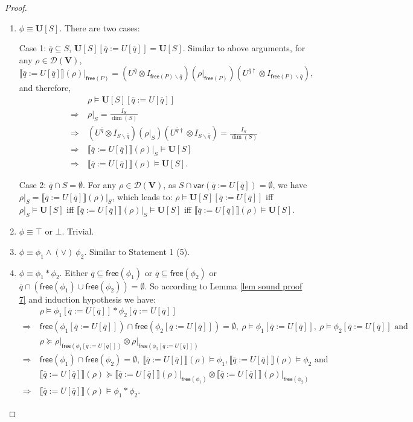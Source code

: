 \documentclass[conference,compsoc, 10pt]{IEEEtran}
\newcommand {\qbar} {{\overline{q}}}
\newcommand {\qU} {{\overline{q}:=U[\overline{q}]}}
\newcommand {\cD } {{\mathcal{D}}}
\newcommand {\id } {{I}}
\newcommand {\free }[1] {{\mathsf{free}\left(#1\right)}}
\newcommand {\rt }[2] {{\left.{#1}\right|_{#2}}}
\newcommand {\vars } {\mathbf{V}}
\newcommand {\var } {\mathsf{var}}
\newcommand {\unia } {{\mathbf{U}}}
\newcommand {\sem}[1] {\llbracket#1\rrbracket}
\begin{document}
\begin{appendices}
\begin{proof}
\begin{enumerate}
				
				\item $\phi\equiv \unia[S]$. There are two cases:
				
				Case 1: $\qbar\subseteq S$, $\unia[S][\qU] = \unia[S]$. Similar to above arguments, for any $\rho\in\cD(\vars)$,			
				$$\rt{\sem{\qU}(\rho)}{\free{P}} = (U^{\qbar}\otimes\id_{\free{P}\backslash \qbar})(\rt{\rho}{\free{P}}) (U^{\qbar\dag}\otimes\id_{\free{P}\backslash \qbar}),$$
				and therefore,
				\begin{align*}
				&\rho\models \unia[S][\qU] \\
				\Longrightarrow\ &\rt{\rho}{S} = \frac{I_S}{\dim(S)} \\
				\Longrightarrow\ &(U^{\qbar}\otimes\id_{S\backslash \qbar})(\rt{\rho}{S}) (U^{\qbar\dag}\otimes\id_{S\backslash \qbar}) = \frac{I_S}{\dim(S)}\\
				\Longrightarrow\ &\rt{\sem{\qU}(\rho)}{S}\models \unia[S] \\ 
				\Longrightarrow\ &\sem{\qU}(\rho)\models \unia[S].
				\end{align*}
				
				Case 2: $\qbar\cap S = \emptyset$. For any $\rho\in\cD(\vars)$, as $S\cap\var(\qU) = \emptyset$, we have
				$\rt{\rho}{S} = \rt{\sem{\qU}(\rho)}{S}$, which leads to: $\rho\models\unia[S][\qU]$ iff $\rt{\rho}{S}\models \unia[S]$ iff $\rt{\sem{\qU}(\rho)}{S}\models \unia[S]$ iff $\sem{\qU}(\rho)\models \unia[S]$.
				
				\item $\phi \equiv \top$ or $\bot$. Trivial.
				
				\item $\phi \equiv \phi_1\wedge\!(\vee)\ \phi_2$. Similar to Statement 1 (5).
				
				\item $\phi \equiv \phi_1\ast\phi_2$. Either $\qbar\subseteq\free{\phi_1}$ or $\qbar\subseteq\free{\phi_2}$ or $\qbar\cap(\free{\phi_1}\cup\free{\phi_2}) = \emptyset$. So according to Lemma \ref{lem sound proof 7} and induction hypothesis we have:
				\begin{align*}
				&\rho\models\phi_1[\qU] \ast \phi_2[\qU] \\
				\Longrightarrow\ &\free{\phi_1[\qU]}\cap\free{\phi_2[\qU]} = \emptyset,\ \rho\models\phi_1[\qU],\ \rho\models\phi_2[\qU] \text{\ and\ }\\
				& \rho\succeq\rt{\rho}{\free{\phi_1[\qU]}}\otimes\rt{\rho}{\free{\phi_2[\qU]}} \\
				\Longrightarrow\ &\free{\phi_1}\cap\free{\phi_2} = \emptyset,\ \sem{\qU}(\rho)\models\phi_1, \sem{\qU}(\rho)\models\phi_2 \text{\ and\ }\\
				&\sem{\qU}(\rho)\succeq\rt{\sem{\qU}(\rho)}{\free{\phi_1}}\otimes\rt{\sem{\qU}(\rho)}{\free{\phi_2}} \\
				\Longrightarrow\ &\sem{\qU}(\rho)\models\phi_1\ast\phi_2. 
				\end{align*}
			\end{enumerate}
			

\end{proof}
\end{appendices}
\end{document}
